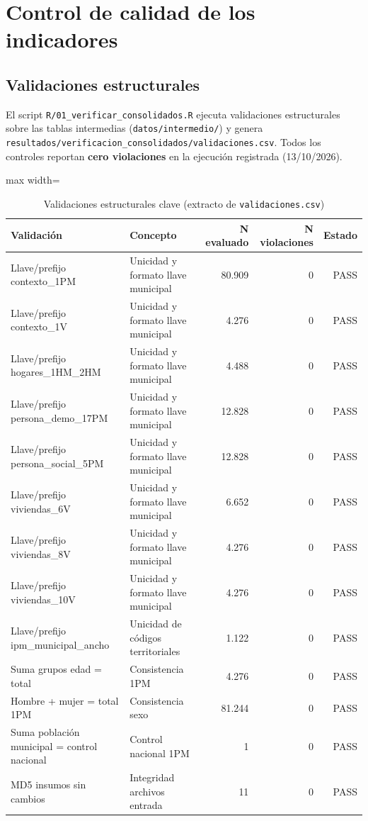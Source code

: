 \section{Control de calidad de los indicadores}
\label{ch:control_calidad}

\subsection{Validaciones estructurales}
\label{sec:validaciones_estructurales}

El script \texttt{R/01\_verificar\_consolidados.R} ejecuta validaciones estructurales sobre las tablas intermedias (\texttt{datos/intermedio/}) y genera \texttt{resultados/verificacion\_consolidados/validaciones.csv}. Todos los controles reportan \textbf{cero violaciones} en la ejecución registrada (13/10/2026).

\begin{table}[htbp]
\centering
\caption{Validaciones estructurales clave (extracto de \texttt{validaciones.csv})}
\label{tab:validaciones_estructurales}
\begin{adjustbox}{max width=\textwidth}
\begin{tabular}{@{}llrrr@{}}
\toprule
\textbf{Validación} & \textbf{Concepto} & \textbf{N evaluado} & \textbf{N violaciones} & \textbf{Estado} \\
\midrule
Llave/prefijo contexto\_1PM & Unicidad y formato llave municipal & 80.909 & 0 & PASS \\
Llave/prefijo contexto\_1V & Unicidad y formato llave municipal & 4.276 & 0 & PASS \\
Llave/prefijo hogares\_1HM\_2HM & Unicidad y formato llave municipal & 4.488 & 0 & PASS \\
Llave/prefijo persona\_demo\_17PM & Unicidad y formato llave municipal & 12.828 & 0 & PASS \\
Llave/prefijo persona\_social\_5PM & Unicidad y formato llave municipal & 12.828 & 0 & PASS \\
Llave/prefijo viviendas\_6V & Unicidad y formato llave municipal & 6.652 & 0 & PASS \\
Llave/prefijo viviendas\_8V & Unicidad y formato llave municipal & 4.276 & 0 & PASS \\
Llave/prefijo viviendas\_10V & Unicidad y formato llave municipal & 4.276 & 0 & PASS \\
Llave/prefijo ipm\_municipal\_ancho & Unicidad de códigos territoriales & 1.122 & 0 & PASS \\
Suma grupos edad = total & Consistencia 1PM & 4.276 & 0 & PASS \\
Hombre + mujer = total 1PM & Consistencia sexo & 81.244 & 0 & PASS \\
Suma población municipal = control nacional & Control nacional 1PM & 1 & 0 & PASS \\
MD5 insumos sin cambios & Integridad archivos entrada & 11 & 0 & PASS \\
\bottomrule
\end{tabular}
\end{adjustbox}
\end{table}

